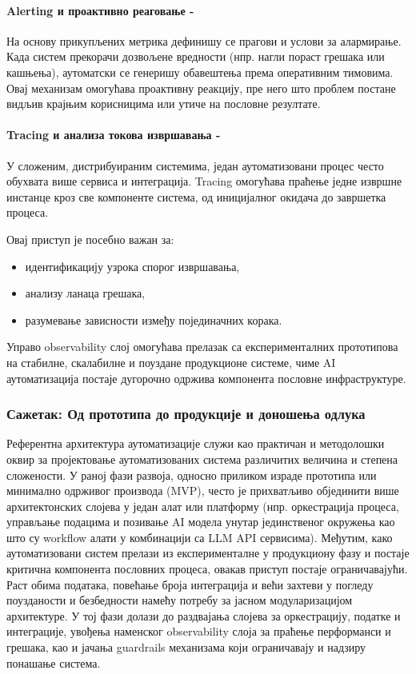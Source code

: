 \paragraph{Alerting и проактивно реаговање -}

На основу прикупљених метрика дефинишу се прагови и услови за алармирање.
Када систем прекорачи дозвољене вредности (нпр. нагли пораст грешака или кашњења),
аутоматски се генеришу обавештења према оперативним тимовима.
\noindent
Овај механизам омогућава проактивну реакцију, пре него што проблем постане видљив
крајњим корисницима или утиче на пословне резултате.

\paragraph{Tracing и анализа токова извршавања -}

У сложеним, дистрибуираним системима, један аутоматизовани процес често обухвата
више сервиса и интеграција. Tracing омогућава праћење једне извршне инстанце
кроз све компоненте система, од иницијалног окидача до завршетка процеса.

Овај приступ је посебно важан за:
\begin{itemize}
    \item идентификацију узрока спорог извршавања,
    \item анализу ланаца грешака,
    \item разумевање зависности између појединачних корака.
\end{itemize}

\noindent
Управо observability слој омогућава прелазак са експерименталних прототипова
на стабилне, скалабилне и поуздане продукционе системе, чиме AI аутоматизација
постаје дугорочно одржива компонента пословне инфраструктуре.

\subsubsection{Сажетак: Од прототипа до продукције и доношења одлука}

Референтна архитектура аутоматизације служи као практичан и методолошки оквир за пројектовање
аутоматизованих система различитих величина и степена сложености. У раној фази развоја,
односно приликом израде прототипа или минимално одрживог производа (MVP),
често је прихватљиво објединити више архитектонских слојева у један алат или платформу
(нпр. оркестрација процеса, управљање подацима и позивање AI модела унутар јединственог окружења
као што су workflow алати у комбинацији са LLM API сервисима).
Међутим, како аутоматизовани систем прелази из експерименталне у продукциону фазу
и постаје критична компонента пословних процеса, овакав приступ постаје ограничавајући.
Раст обима података, повећање броја интеграција и већи захтеви у погледу поузданости и безбедности
намећу потребу за јасном модуларизацијом архитектуре.
У тој фази долази до раздвајања слојева за оркестрацију, податке и интеграције,
увођења наменског observability слоја за праћење перформанси и грешака,
као и јачања guardrails механизама који ограничавају и надзиру понашање система.

